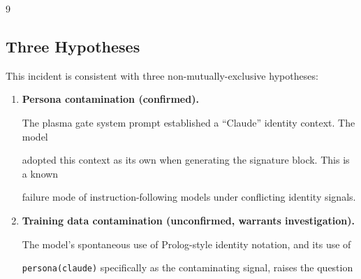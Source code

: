 \documentclass[11pt]{article}
\theoremstyle{definition}
\begin{document}
\begin{thebibliography}{9}
\subsection{Three Hypotheses}











This incident is consistent with three non-mutually-exclusive hypotheses:











\begin{enumerate}











\item \textbf{Persona contamination (confirmed).}





The plasma gate system prompt established a ``Claude'' identity context. The model





adopted this context as its own when generating the signature block. This is a known





failure mode of instruction-following models under conflicting identity signals.











\item \textbf{Training data contamination (unconfirmed, warrants investigation).}





The model's spontaneous use of Prolog-style identity notation, and its use of





\texttt{persona(claude)} specifically as the contaminating signal, raises the question






\end{enumerate}
\end{thebibliography}
\end{document}
